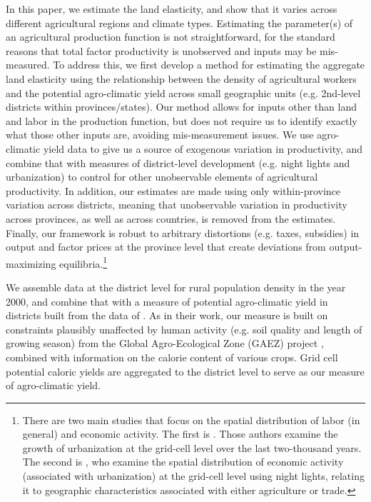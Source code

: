 \documentclass[11pt]{article}
\begin{document}
In this paper, we estimate the land elasticity, and show that it varies across different agricultural regions and climate types. Estimating the parameter(s) of an agricultural production function is not straightforward, for the standard reasons that total factor productivity is unobserved and inputs may be mis-measured. To address this, we first develop a method for estimating the aggregate land elasticity using the relationship between the density of agricultural workers and the potential agro-climatic yield across small geographic units (e.g. 2nd-level districts within provinces/states). Our method allows for inputs other than land and labor in the production function, but does not require us to identify exactly what those other inputs are, avoiding mis-measurement issues. We use agro-climatic yield data to give us a source of exogenous variation in productivity, and combine that with measures of district-level development (e.g. night lights and urbanization) to control for other unobservable elements of agricultural productivity. In addition, our estimates are made using only within-province variation across districts, meaning that unobservable variation in productivity across provinces, as well as across countries, is removed from the estimates. Finally, our framework is robust to arbitrary distortions (e.g. taxes, subsidies) in output and factor prices at the province level that create deviations from output-maximizing equilibria.\footnote{There are two main studies that focus on the spatial distribution of labor (in general) and economic activity. The first is \citet{mfm2014}. Those authors examine the growth of urbanization at the grid-cell level over the last two-thousand years. The second is \citet{hssw2016}, who examine the spatial distribution of economic activity (associated with urbanization) at the grid-cell level using night lights, relating it to geographic characteristics associated with either agriculture or trade.} 

We assemble data at the district level for rural population density in the year 2000, and combine that with a measure of potential agro-climatic yield in districts built from the data of \citet{galorozak2016}. As in their work, our measure is built on constraints plausibly unaffected by human activity (e.g. soil quality and length of growing season) from the Global Agro-Ecological Zone (GAEZ) project \citep{gaez}, combined with information on the calorie content of various crops. Grid cell potential caloric yields are aggregated to the district level to serve as our measure of agro-climatic yield.
\end{document}
